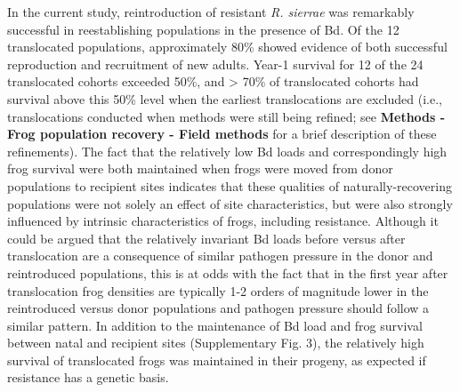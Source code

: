 \documentclass[
  letterpaper,
  DIV=11,
  numbers=noendperiod]{scrartcl}
\begin{document}
In the current study, reintroduction of resistant \emph{R. sierrae} was
remarkably successful in reestablishing populations in the presence of
Bd. Of the 12 translocated populations, approximately 80\% showed
evidence of both successful reproduction and recruitment of new adults.
Year-1 survival for 12 of the 24 translocated cohorts exceeded 50\%, and
\textgreater{} 70\% of translocated cohorts had survival above this 50\%
level when the earliest translocations are excluded (i.e.,
translocations conducted when methods were still being refined; see
\textbf{Methods - Frog population recovery - Field methods} for a brief
description of these refinements). The fact that the relatively low Bd
loads and correspondingly high frog survival were both maintained when
frogs were moved from donor populations to recipient sites indicates
that these qualities of naturally-recovering populations were not solely
an effect of site characteristics, but were also strongly influenced by
intrinsic characteristics of frogs, including resistance. Although it
could be argued that the relatively invariant Bd loads before versus
after translocation are a consequence of similar pathogen pressure in
the donor and reintroduced populations, this is at odds with the fact
that in the first year after translocation frog densities are typically
1-2 orders of magnitude lower in the reintroduced versus donor
populations and pathogen pressure should follow a similar pattern. In
addition to the maintenance of Bd load and frog survival between natal
and recipient sites (Supplementary Fig. 3), the relatively high survival
of translocated frogs was maintained in their progeny, as expected if
resistance has a genetic basis.
\end{document}
